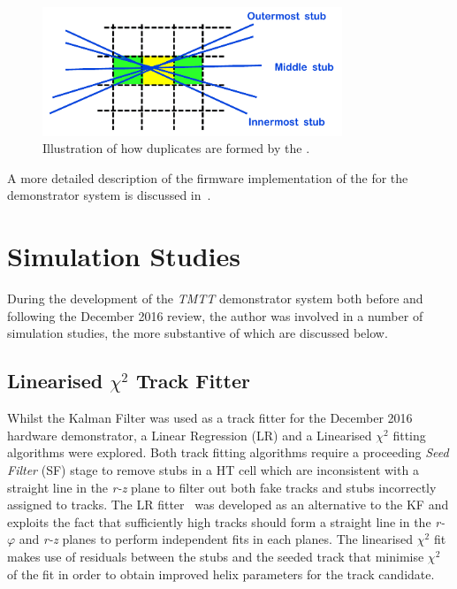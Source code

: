 \begin{figure}[!h]
\centering
\includegraphics[width=0.80\textwidth]{figs/tk-upgrade/A50_algo.pdf}
\caption{Illustration of how duplicates are formed by the \rphi \HT.}
\label{fig:DR}
\end{figure}

A more detailed description of the firmware implementation of the \DR for the demonstrator system is discussed in~\cite{TMTT_JINST}.

\section{Simulation Studies}\label{sec:TmttSimStudies}
During the development of the \emph{TMTT} demonstrator system both before and following the December 2016 review, the author was involved in a number of simulation studies, the more substantive of which are discussed below.

\subsection{Linearised $\chi^{2}$ Track Fitter}\label{subsec:chi2}
Whilst the Kalman Filter was used as a track fitter for the December 2016 hardware demonstrator, a Linear Regression (LR) and a Linearised $\chi^{2}$ fitting algorithms were explored.
Both track fitting algorithms require a proceeding \emph{Seed Filter} (SF) stage to remove stubs in a HT cell which are inconsistent with a straight line in the \emph{r-z} plane to filter out both fake tracks and stubs incorrectly assigned to tracks.
The LR fitter~\cite{TMTT_FLP} was developed as an alternative to the KF and exploits the fact that sufficiently high \pT tracks should form a straight line in the \emph{r-$\varphi$} and \emph{r-z} planes to perform independent fits in each planes.
The linearised $\chi^{2}$ fit makes use of residuals between the stubs and the seeded track that minimise $\chi^{2}$ of the fit in order to obtain improved helix parameters for the track candidate.

